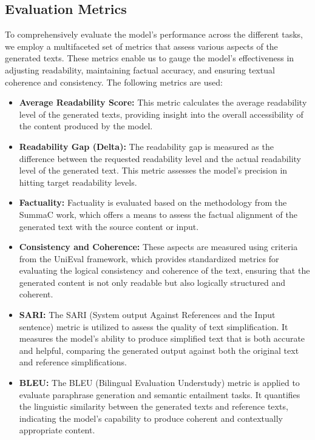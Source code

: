 \documentclass[11pt]{article}
\begin{document}
\subsection{Evaluation Metrics}

To comprehensively evaluate the model's performance across the different tasks, we employ a multifaceted set of metrics that assess various aspects of the generated texts. These metrics enable us to gauge the model's effectiveness in adjusting readability, maintaining factual accuracy, and ensuring textual coherence and consistency. The following metrics are used:

\begin{itemize}
[leftmargin=.1in,topsep=0.3pt]
\setlength\itemsep{0em}
\vspace{-0.2em}
    \item \textbf{Average Readability Score:} This metric calculates the average readability level of the generated texts, providing insight into the overall accessibility of the content produced by the model.
    
    \item \textbf{Readability Gap (Delta):} The readability gap is measured as the difference between the requested readability level and the actual readability level of the generated text. This metric assesses the model's precision in hitting target readability levels.
    
    \item \textbf{Factuality:} Factuality is evaluated based on the methodology from the SummaC \cite{laban2022summac} work, which offers a means to assess the factual alignment of the generated text with the source content or input.
    
    \item \textbf{Consistency and Coherence:} These aspects are measured using criteria from the UniEval \cite{zhong2022towards} framework, which provides standardized metrics for evaluating the logical consistency and coherence of the text, ensuring that the generated content is not only readable but also logically structured and coherent.
    
    \item \textbf{SARI:} The SARI (System output Against References and the Input sentence) \cite{xu2016optimizing} metric is utilized to assess the quality of text simplification. It measures the model's ability to produce simplified text that is both accurate and helpful, comparing the generated output against both the original text and reference simplifications.
    
    \item \textbf{BLEU:} The BLEU (Bilingual Evaluation Understudy) \cite{papineni2002bleu} metric is applied to evaluate paraphrase generation and semantic entailment tasks. It quantifies the linguistic similarity between the generated texts and reference texts, indicating the model's capability to produce coherent and contextually appropriate content.
\end{itemize}
\end{document}
